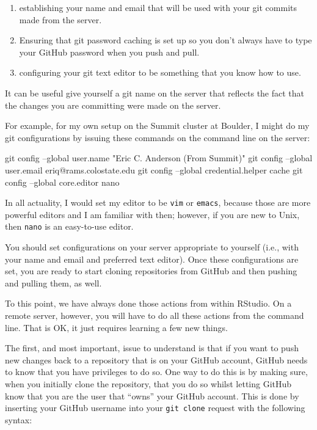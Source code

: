 \documentclass[]{krantz}
\makeatletter
\newenvironment{Shaded}{\begin{snugshade}}{\end{snugshade}}
\newcommand{\FunctionTok}[1]{\textcolor[rgb]{0,0,0}{#1}}
\newcommand{\NormalTok}[1]{#1}
\newcommand{\StringTok}[1]{\textcolor[rgb]{0.5,0.5,0.5}{#1}}
\providecommand{\tightlist}{%
  \setlength{\itemsep}{0pt}\setlength{\parskip}{0pt}}
\newenvironment{kframe}{%
\medskip{}
\setlength{\fboxsep}{.8em}
 \def\at@end@of@kframe{}%
 \ifinner\ifhmode%
  \def\at@end@of@kframe{\end{minipage}}%
  \begin{minipage}{\columnwidth}%
 \fi\fi%
 \def\FrameCommand##1{\hskip\@totalleftmargin \hskip-\fboxsep
 \colorbox{shadecolor}{##1}\hskip-\fboxsep
     \hskip-\linewidth \hskip-\@totalleftmargin \hskip\columnwidth}%
 \MakeFramed {\advance\hsize-\width
   \@totalleftmargin\z@ \linewidth\hsize
   \@setminipage}}%
 {\par\unskip\endMakeFramed%
 \at@end@of@kframe}
\renewenvironment{Shaded}{\begin{kframe}}{\end{kframe}}
\makeatother
\begin{document}
\begin{enumerate}
\def\labelenumi{\arabic{enumi}.}
\tightlist
\item
  establishing your name and email that will be used with your git commits
  made from the server.
\item
  Ensuring that git password caching is set up so you don't always have
  to type your GitHub password when you push and pull.
\item
  configuring your git text editor to be something that you know how
  to use.
\end{enumerate}

It can be useful give yourself a git name on the server that reflects
the fact that the changes you are committing were made on the server.

For example, for my own setup on the Summit cluster at Boulder, I might
do my git configurations by issuing these commands on the
command line on the server:

\begin{Shaded}
\begin{Highlighting}[]
\FunctionTok{git}\NormalTok{ config --global user.name }\StringTok{"Eric C. Anderson (From Summit)"}
\FunctionTok{git}\NormalTok{ config --global user.email eriq@rams.colostate.edu}
\FunctionTok{git}\NormalTok{ config --global credential.helper cache}
\FunctionTok{git}\NormalTok{ config --global core.editor nano}
\end{Highlighting}
\end{Shaded}

In all actuality, I would set my editor to be \texttt{vim} or \texttt{emacs}, because those are
more powerful editors and I am familiar with then; however, if you are new to Unix,
then \texttt{nano} is an easy-to-use editor.

You should set configurations on your server appropriate to yourself
(i.e., with your name and email and preferred text editor). Once these configurations are set, you are ready to start cloning
repositories from GitHub and then pushing and pulling them, as well.

To this point, we have always done those actions from within
RStudio. On a remote server, however, you will have to do all these
actions from the command line. That is OK, it just requires learning
a few new things.

The first, and most important, issue to understand is that if you want
to push new changes back to a repository that is on your GitHub account,
GitHub needs to know that you have privileges to do so. One way to
do this is by making sure, when you initially clone the repository,
that you do so whilst letting GitHub know that you are the user that
``owns'' your GitHub account. This is done by inserting your GitHub
username into your \texttt{git\ clone} request with the following syntax:
\end{document}
